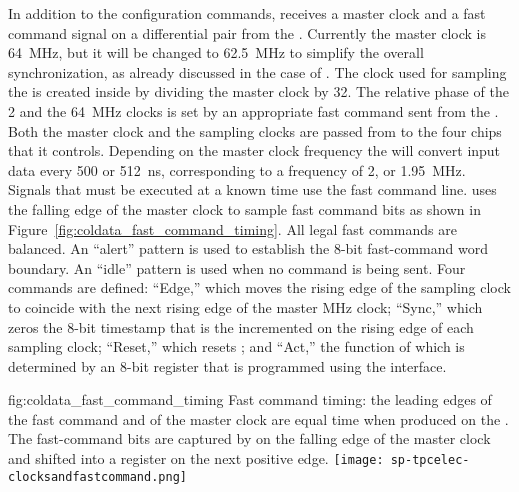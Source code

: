 In addition to the configuration commands,  
receives a master clock and a fast command signal on a  
differential pair from
the . Currently the master clock is \SI{64}{MHz}, but it will be
changed to \SI{62.5}{MHz} to simplify the overall   
synchronization, as already discussed in the case of . The clock 
used for sampling the  is created inside
 by dividing the master clock by \num{32}. The relative phase
of the \num{2} and the \SI{64}{MHz} clocks is set by an appropriate fast
command sent from the .  Both the master clock and
the  sampling clocks are passed from  to the four
 chips that it controls. Depending on the master clock frequency
the  will convert input data every \num{500} or \SI{512}{ns}, 
corresponding to a frequency of \num{2}, or \SI{1.95}{MHz}. Signals that must be
executed at a known time use the fast command line.  
uses the falling edge of the master clock to sample fast command bits as shown 
in Figure~\ref{fig:coldata_fast_command_timing}. All legal fast commands 
are  balanced. An ``alert'' pattern is used to establish the 8-bit 
fast-command word boundary. An ``idle'' pattern is used when no command is being 
sent. Four commands are defined: ``Edge,'' which moves the rising edge of the 
 sampling clock to coincide with the next rising edge of the 
master MHz clock; ``Sync,'' which zeros the \num{8}-bit timestamp that is the incremented 
on the rising edge of each  sampling clock; ``Reset,'' which resets 
; and ``Act,'' the function of which is determined by an \num{8}-bit 
register that is programmed using the  interface.  

\begin{dunefigure}
{fig:coldata_fast_command_timing}
{Fast command timing: the leading edges of the fast command and of the master 
clock are equal time when produced on the . The fast-command bits 
are captured by  on the falling edge of the master clock and 
shifted into a register on the next positive edge.}
\texttt{[image: sp-tpcelec-clocksandfastcommand.png]}
\end{dunefigure}

